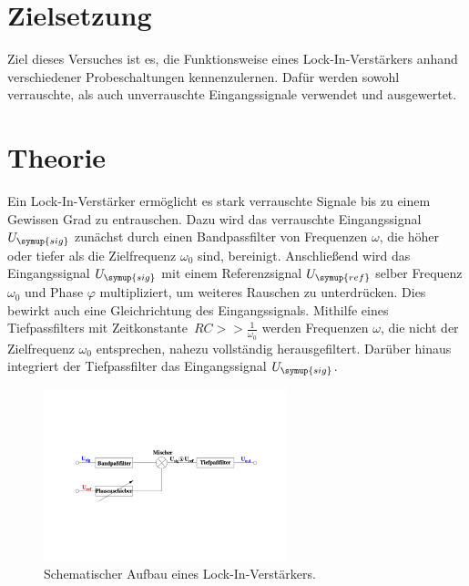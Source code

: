 \section{Zielsetzung}
\label{sec:Zielsetzung}
Ziel dieses Versuches ist es, die Funktionsweise eines Lock-In-Verstärkers anhand verschiedener Probeschaltungen 
kennenzulernen. Dafür werden sowohl verrauschte, als auch unverrauschte Eingangssignale verwendet und ausgewertet.

\section{Theorie}
\label{sec:Theorie}
Ein Lock-In-Verstärker ermöglicht es stark verrauschte Signale bis zu einem Gewissen Grad zu entrauschen. Dazu wird
das verrauschte Eingangssignal $U_{\symup{sig}}$ zunächst durch einen Bandpassfilter von Frequenzen $\omega$, die höher 
oder tiefer als die Zielfrequenz $\omega_{0}$ sind, bereinigt. Anschließend wird das Eingangssignal $U_{\symup{sig}}$ mit 
einem Referenzsignal $U_{\symup{ref}}$ selber Frequenz $\omega_{0}$ und Phase $\varphi$ multipliziert, um weiteres Rauschen 
zu unterdrücken. Dies bewirkt auch eine Gleichrichtung des Eingangssignals. Mithilfe eines Tiefpassfilters mit 
Zeitkonstante~$RC >> \frac{1}{\omega_{0}}$ werden Frequenzen $\omega$, die nicht der Zielfrequenz $\omega_{0}$ entsprechen,
nahezu vollständig herausgefiltert. Darüber hinaus integriert der Tiefpassfilter das Eingangssignal $U_{\symup{sig}}$.

\begin{figure} [H]
    \centering
    \includegraphics[height=5cm]{content/Bilder/Aufbau_LockInVerstaerker.pdf}
    \caption{Schematischer Aufbau eines Lock-In-Verstärkers.\cite{v303}}
    \label{fig:Aufbau}
\end{figure}

